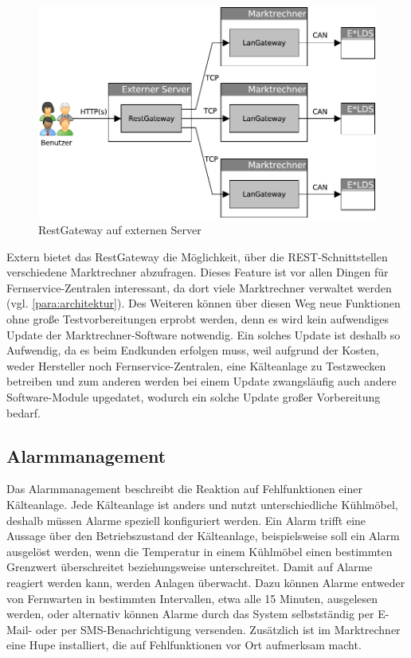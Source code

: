 \documentclass[11pt,a4paper]{report}
\begin{document}
\begin{figure}[htbp]
\centering
\includegraphics[scale=0.7]{images/RestGateway_extern.pdf}
\caption[]{RestGateway auf externen Server}
\label{fig:rest_extern}
\end{figure}

Extern bietet das RestGateway die Möglichkeit, über die REST-Schnittstellen verschiedene Marktrechner abzufragen. Dieses Feature ist vor allen Dingen für Fernservice-Zentralen interessant, da dort viele Marktrechner verwaltet werden (vgl. \ref{para:architektur}). Des Weiteren können über diesen Weg neue Funktionen ohne große Testvorbereitungen erprobt werden, denn es wird kein aufwendiges Update der Marktrechner-Software notwendig. Ein solches Update ist deshalb so Aufwendig, da es beim Endkunden erfolgen muss, weil aufgrund der Kosten, weder Hersteller noch Fernservice-Zentralen, eine Kälteanlage zu Testzwecken betreiben und zum anderen werden bei einem Update zwangsläufig auch andere Software-Module upgedatet, wodurch ein solche Update großer Vorbereitung bedarf.

\subsection{Alarmmanagement} 

Das Alarmmanagement beschreibt die Reaktion auf Fehlfunktionen einer Kälteanlage. Jede Kälteanlage ist anders und nutzt unterschiedliche Kühlmöbel, deshalb müssen Alarme speziell konfiguriert werden. Ein Alarm trifft eine Aussage über den Betriebszustand der Kälteanlage, beispielsweise soll ein Alarm ausgelöst werden, wenn die Temperatur in einem Kühlmöbel einen bestimmten Grenzwert überschreitet beziehungsweise unterschreitet. Damit auf Alarme reagiert werden kann, werden Anlagen überwacht. Dazu können Alarme entweder von Fernwarten in bestimmten Intervallen, etwa alle 15 Minuten, ausgelesen werden, oder alternativ können Alarme durch das System selbstständig per E-Mail- oder per SMS-Benachrichtigung versenden. Zusätzlich ist im Marktrechner eine Hupe installiert, die auf Fehlfunktionen vor Ort aufmerksam macht. 
\end{document}
